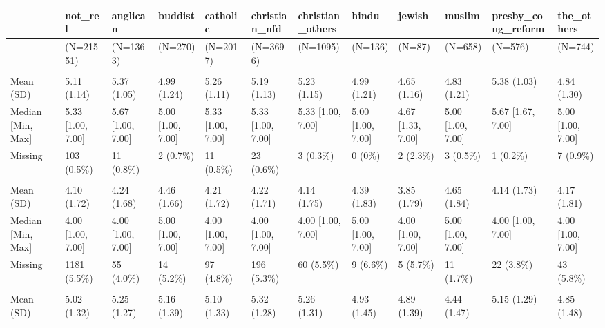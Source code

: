 \documentclass[
  single column]{article}
\begin{document}
\begin{landscape}



\begin{tabular}[t]{llllllllllll}
\toprule
  & not\_rel & anglican & buddist & catholic & christian\_nfd & christian\_others & hindu & jewish & muslim & presby\_cong\_reform & the\_others\\
\midrule
 & (N=21551) & (N=1363) & (N=270) & (N=2017) & (N=3696) & (N=1095) & (N=136) & (N=87) & (N=658) & (N=576) & (N=744)\\
\addlinespace[0.3em]
\multicolumn{12}{l}{\textbf{belong}}\\
\hspace{1em}Mean (SD) & 5.11 (1.14) & 5.37 (1.05) & 4.99 (1.24) & 5.26 (1.11) & 5.19 (1.13) & 5.23 (1.15) & 4.99 (1.21) & 4.65 (1.16) & 4.83 (1.21) & 5.38 (1.03) & 4.84 (1.30)\\
\hspace{1em}Median [Min, Max] & 5.33 [1.00, 7.00] & 5.67 [1.00, 7.00] & 5.00 [1.00, 7.00] & 5.33 [1.00, 7.00] & 5.33 [1.00, 7.00] & 5.33 [1.00, 7.00] & 5.00 [1.00, 7.00] & 4.67 [1.33, 7.00] & 5.00 [1.00, 7.00] & 5.67 [1.67, 7.00] & 5.00 [1.00, 7.00]\\
\hspace{1em}Missing & 103 (0.5\%) & 11 (0.8\%) & 2 (0.7\%) & 11 (0.5\%) & 23 (0.6\%) & 3 (0.3\%) & 0 (0\%) & 2 (2.3\%) & 3 (0.5\%) & 1 (0.2\%) & 7 (0.9\%)\\
\addlinespace[0.3em]
\multicolumn{12}{l}{\textbf{bodysat}}\\
\hspace{1em}Mean (SD) & 4.10 (1.72) & 4.24 (1.68) & 4.46 (1.66) & 4.21 (1.72) & 4.22 (1.71) & 4.14 (1.75) & 4.39 (1.83) & 3.85 (1.79) & 4.65 (1.84) & 4.14 (1.73) & 4.17 (1.81)\\
\hspace{1em}Median [Min, Max] & 4.00 [1.00, 7.00] & 4.00 [1.00, 7.00] & 5.00 [1.00, 7.00] & 4.00 [1.00, 7.00] & 4.00 [1.00, 7.00] & 4.00 [1.00, 7.00] & 5.00 [1.00, 7.00] & 4.00 [1.00, 7.00] & 5.00 [1.00, 7.00] & 4.00 [1.00, 7.00] & 4.00 [1.00, 7.00]\\
\hspace{1em}Missing & 1181 (5.5\%) & 55 (4.0\%) & 14 (5.2\%) & 97 (4.8\%) & 196 (5.3\%) & 60 (5.5\%) & 9 (6.6\%) & 5 (5.7\%) & 11 (1.7\%) & 22 (3.8\%) & 43 (5.8\%)\\
\addlinespace[0.3em]
\multicolumn{12}{l}{\textbf{forgiveness}}\\
\hspace{1em}Mean (SD) & 5.02 (1.32) & 5.25 (1.27) & 5.16 (1.39) & 5.10 (1.33) & 5.32 (1.28) & 5.26 (1.31) & 4.93 (1.45) & 4.89 (1.39) & 4.44 (1.47) & 5.15 (1.29) & 4.85 (1.48)\\

\end{tabular}
\end{landscape}
\end{document}
